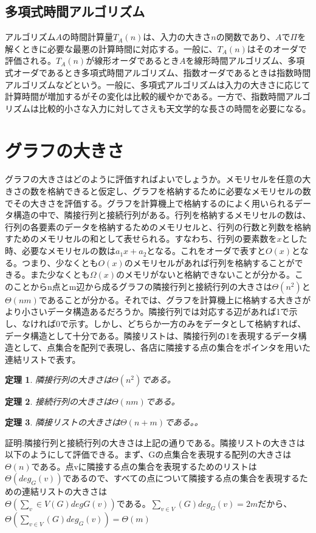 \documentclass[twocolumn]{jarticle}
\newtheorem{tem}{定理}
\begin{document}
\subsection{多項式時間アルゴリズム}
アルゴリズム$A$の時間計算量$T_A(n)$は、入力の大きさ$n$の関数であり、$A$で$\Pi$を解くときに必要な最悪の計算時間に対応する。一般に、$T_A(n)$はそのオーダで評価される。$T_A(n)$が線形オーダであるとき$A$を線形時間アルゴリズム、多項式オーダであるとき多項式時間アルゴリズム、指数オーダであるときは指数時間アルゴリズムなどという。一般に、多項式アルゴリズムは入力の大きさに応じて計算時間が増加するがその変化は比較的緩やかである。一方で、指数時間アルゴリズムは比較的小さな入力に対してさえも天文学的な長さの時間を必要になる。

\section{グラフの大きさ}
グラフの大きさはどのように評価すればよいでしょうか。メモリセルを任意の大きさの数を格納できると仮定し、グラフを格納するために必要なメモリセルの数でその大きさを評価する。グラフを計算機上で格納するのによく用いられるデータ構造の中で、隣接行列と接続行列がある。行列を格納するメモリセルの数は、行列の各要素のデータを格納するためのメモリセルと、行列の行数と列数を格納すためのメモリセルの和として表せられる。すなわち、行列の要素数を$x$とした時、必要なメモリセルの数は$a_1x+a_2$となる。これをオーダで表すと$O(x)$となる。つまり、少なくとも$O(x)$のメモリセルがあれば行列を格納することができる。また少なくとも$\Omega(x)$のメモリがないと格納できないことが分かる。このことからn点とm辺から成るグラフの隣接行列と接続行列の大きさは$\Theta(n^2)$と$\Theta(nm)$であることが分かる。それでは、グラフを計算機上に格納する大きさがより小さいデータ構造あるだろうか。隣接行列では対応する辺があれば1で示し、なければ0で示す。しかし、どちらか一方のみをデータとして格納すれば、データ構造として十分である。隣接リストは、隣接行列の1を表現するデータ構造として、点集合を配列で表現し、各店に隣接する点の集合をポインタを用いた連結リストで表す。

\begin{tem}
    隣接行列の大きさは$\Theta(n^2)$である。
\end{tem}
\begin{tem}
    接続行列の大きさは$\Theta(nm)$である。
\end{tem}
\begin{tem}
    隣接リストの大きさは$\Theta(n+m)$である。。
\end{tem}

証明:隣接行列と接続行列の大きさは上記の通りである。隣接リストの大きさは以下のようにして評価できる。まず、Gの点集合を表現する配列の大きさは$\Theta(n)$である。点vに隣接する点の集合を表現するためのリストは$\Theta(deg_G(v))$であるので、すべての点について隣接する点の集合を表現するための連結リストの大きさは$\Theta(\sum_v∈V(G)degG(v))である。\sum_{v∈V}(G)deg_G(v) = 2m$だから、$\Theta(\sum_{v∈V}(G)deg_G(v)) = \Theta(m)$
\end{document}
